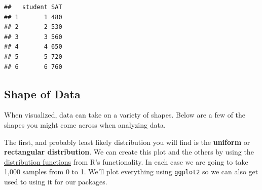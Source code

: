 \documentclass[]{book}
\newenvironment{Shaded}{\begin{snugshade}}{\end{snugshade}}
\newcommand{\KeywordTok}[1]{\textcolor[rgb]{0.13,0.29,0.53}{\textbf{#1}}}
\newcommand{\DataTypeTok}[1]{\textcolor[rgb]{0.13,0.29,0.53}{#1}}
\newcommand{\DecValTok}[1]{\textcolor[rgb]{0.00,0.00,0.81}{#1}}
\newcommand{\StringTok}[1]{\textcolor[rgb]{0.31,0.60,0.02}{#1}}
\newcommand{\CommentTok}[1]{\textcolor[rgb]{0.56,0.35,0.01}{\textit{#1}}}
\newcommand{\OperatorTok}[1]{\textcolor[rgb]{0.81,0.36,0.00}{\textbf{#1}}}
\newcommand{\NormalTok}[1]{#1}
\theoremstyle{definition}
\theoremstyle{definition}
\theoremstyle{definition}
\theoremstyle{remark}
\begin{document}
\begin{verbatim}
##   student SAT
## 1       1 480
## 2       2 530
## 3       3 560
## 4       4 650
## 5       5 720
## 6       6 760
\end{verbatim}

\subsection{Shape of Data}\label{shape-of-data}

When visualized, data can take on a variety of shapes. Below are a few
of the shapes you might come across when analyzing data.

The first, and probably least likely distribution you will find is the
\textbf{uniform} or \textbf{rectangular distribution}. We can create
this plot and the others by using the
\href{https://en.wikibooks.org/wiki/R_Programming/Probability_Distributions\#Uniform_distribution}{distribution
functions} from R's functionality. In each case we are going to take
1,000 samples from 0 to 1. We'll plot everything using \texttt{ggplot2}
so we can also get used to using it for our packages.

\begin{Shaded}
\end{Shaded}
\end{document}
